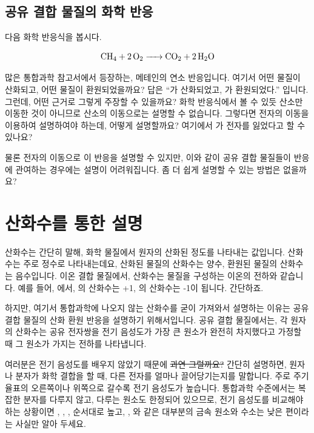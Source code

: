 \documentclass{article}
\begin{document}
\subsection{공유 결합 물질의 화학 반응}
다음 화학 반응식을 봅시다.

\[
    \ce{CH_4 + 2O_2 -> CO_2 + 2H_2O}
\]

많은 통합과학 참고서에서 등장하는, 메테인의 연소 반응입니다. 여기서 어떤 물질이 산화되고, 어떤 물질이 환원되었을까요? 답은 ``가 산화되었고, 가 환원되었다.'' 입니다. 그런데, 어떤 근거로 그렇게 주장할 수 있을까요? 화학 반응식에서 볼 수 있듯 산소만 이동한 것이 아니므로 산소의 이동으로는 설명할 수 없습니다. 그렇다면 전자의 이동을 이용하여 설명하여야 하는데, 어떻게 설명할까요? 여기에서 가 전자를 잃었다고 할 수 있나요? \newline

물론 전자의 이동으로 이 반응을 설명할 수 있지만, 이와 같이 공유 결합 물질들이 반응에 관여하는 경우에는 설명이 어려워집니다. 좀 더 쉽게 설명할 수 있는 방법은 없을까요?

\section{산화수를 통한 설명}
산화수는 간단히 말해, 화학 물질에서 원자의 산화된 정도를 나타내는 값입니다. 산화수는 주로 정수로 나타내는데요, 산화된 물질의 산화수는 양수, 환원된 물질의 산화수는 음수입니다. 이온 결합 물질에서, 산화수는 물질을 구성하는 이온의 전하와 같습니다. 예를 들어, 에서, 의 산화수는 +1, 의 산화수는 -1이 됩니다. 간단하죠. \newline

하지만, 여기서 통합과학에 나오지 않는 산화수를 굳이 가져와서 설명하는 이유는 공유 결합 물질의 산화 환원 반응을 설명하기 위해서입니다. 공유 결합 물질에서는, 각 원자의 산화수는 공유 전자쌍을 전기 음성도가 가장 큰 원소가 완전히 차지했다고 가정할 때 그 원소가 가지는 전하를 나타냅니다. \newline

여러분은 전기 음성도를 배우지 않았기 때문에 \sout{과연 그럴까요?} 간단히 설명하면, 원자나 분자가 화학 결합을 할 때, 다른 전자를 얼마나 끌어당기는지를 말합니다. 주로 주기율표의 오른쪽이나 위쪽으로 갈수록 전기 음성도가 높습니다. 통합과학 수준에서는 복잡한 분자를 다루지 않고, 다루는 원소도 한정되어 있으므로, 전기 음성도를 비교해야 하는 상황이면 , , ,  순서대로 높고, , 와 같은 대부분의 금속 원소와 수소는 낮은 편이라는 사실만 알아 두세요. \newline
\end{document}

